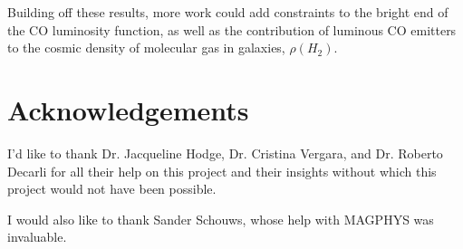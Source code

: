 \documentclass[twoside,single]{lion-msc}
\begin{document}
Building off these results, more work could add constraints to the bright end of the CO luminosity function, as well as the contribution of luminous CO emitters to the cosmic density of molecular gas in galaxies, $\rho(H_2)$.

\clearpage
\section*{Acknowledgements}

I'd like to thank Dr. Jacqueline Hodge, Dr. Cristina Vergara, and Dr. Roberto Decarli for all their help on this project and their insights without which this project would not have been possible. 

I would also like to thank Sander Schouws, whose help with MAGPHYS was invaluable. 

\renewcommand\bibname{References}



\appendix

\end{document}

